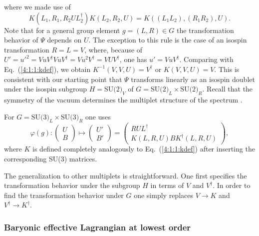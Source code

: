 \documentclass[twoside,12pt]{article}
\begin{document}
where we made use of
\begin{displaymath}
K(L_1, R_1, R_2 U L_2^\dagger)K (L_2,R_2,U)
=K((L_1 L_2), (R_1 R_2),U).
\end{displaymath}
   Note that for a general group element $g=(L,R)\in G$ the transformation behavior
of $\Psi$ depends on $U$.
   The exception to this rule is the case of an isospin transformation $R=L=V$,
where, because of $U'=u'^2=VuV^\dagger VuV^\dagger=Vu^2V^\dagger=VUV^\dagger$, one
has $u'=VuV^\dagger$.
   Comparing with Eq.\ (\ref{4:1:1:kdef}), we obtain $K^{-1}(V,V,U)=V^\dagger$ or
$K(V,V,U)=V$.
   This is consistent with our starting point that $\Psi$ transforms linearly as
an isospin doublet under the isospin subgroup $H=\mbox{SU(2)}_V$ of
$G=\mbox{SU(2)}_L\times\mbox{SU(2)}_R$.
   Recall that the symmetry of the vacuum determines the multiplet structure of
the spectrum \cite{Coleman:1966:1:1}.

   For $G=\mbox{SU(3)}_L\times \mbox{SU(3)}_R$ one uses
\begin{equation}
\label{4:1:1:su3real}
\varphi(g):\left(\begin{array}{c}U\\ B\end{array}\right)\mapsto
\left(\begin{array}{c}U'\\ B'\end{array}\right)
=\left(\begin{array}{c}RUL^\dagger\\K(L,R,U)B K^\dagger(L,R,U)
\end{array}\right),
\end{equation}
where $K$ is defined completely analogously to Eq.\ (\ref{4:1:1:kdef}) after
inserting the corresponding SU(3) matrices.

   The generalization to other multiplets is straightforward. One first specifies
the transformation behavior under the subgroup $H$ in terms of $V$ and $V^\dagger$.
   In order to find the transformation behavior under $G$ one simply replaces $V\to K$
and $V^\dagger\to K^\dagger$.


\subsubsection{Baryonic effective Lagrangian at lowest order}
\label{sec_loebl}
\end{document}
